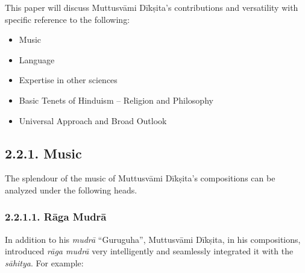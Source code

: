 This paper will discuss Muttusvāmi Dīkṣita’s contributions and versatility with specific reference to the following:

\begin{itemize}
\itemsep=0pt
\item Music

 \item Language

 \item Expertise in other sciences

 \item Basic Tenets of Hinduism – Religion and Philosophy

 \item Universal Approach and Broad Outlook

\end{itemize}


\subsection*{2.2.1. Music}

The splendour of the music of Muttusvāmi Dīkṣita’s compositions can be analyzed under the following heads.

\subsubsection*{2.2.1.1. Rāga Mudrā}

In addition to his \textit{mudrā} “Guruguha”, Muttusvāmi Dīkṣita, in his compositions, introduced \textit{rāga mudrā} very intelligently and seamlessly integrated it with the \textit{sāhitya}. For example:

